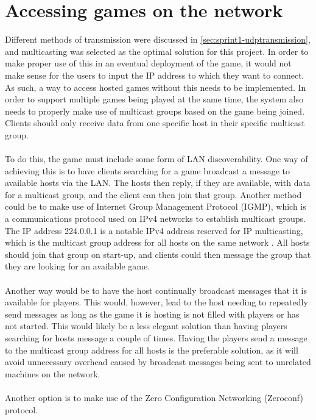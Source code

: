 \section{Accessing games on the network}\label{sec:accessonnetwork}
Different methods of transmission were discussed in \autoref{sec:sprint1-udptransmission}, and multicasting was selected as the optimal solution for this project.
In order to make proper use of this in an eventual deployment of the game, it would not make sense for the users to input the IP address to which they want to connect.
As such, a way to access hosted games without this needs to be implemented.
In order to support multiple games being played at the same time, the system also needs to properly make use of multicast groups based on the game being joined.
Clients should only receive data from one specific host in their specific multicast group.
\\\\
To do this, the game must include some form of LAN discoverability.
One way of achieving this is to have clients searching for a game broadcast a message to available hosts via the LAN.
The hosts then reply, if they are available, with data for a multicast group, and the client can then join that group.
Another method could be to make use of Internet Group Management Protocol (IGMP), which is a communications protocol used on IPv4 networks to establish multicast groups.
The IP address 224.0.0.1 is a notable IPv4 address reserved for IP multicasting, which is the multicast group address for all hosts on the same network \cite{ipv4multicastaddresses}.
All hosts should join that group on start-up, and clients could then message the group that they are looking for an available game.
\\\\
Another way would be to have the host continually broadcast messages that it is available for players.
This would, however, lead to the host needing to repeatedly send messages as long as the game it is hosting is not filled with players or has not started.
This would likely be a less elegant solution than having players searching for hosts message a couple of times.
Having the players send a message to the multicast group address for all hosts is the preferable solution, as it will avoid unnecessary overhead caused by broadcast messages being sent to unrelated machines on the network.
\\\\
Another option is to make use of the Zero Configuration Networking (Zeroconf) protocol.
